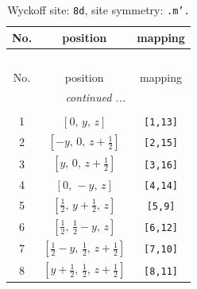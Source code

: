\documentclass[fleqn,8pt]{jsarticle}
\begin{document}
\begin{longtable}{ccc}
\caption{Wyckoff site: {\tt 8d}, site symmetry: {\tt .m'.}}
 \\
 \hline \hline
No. & position & mapping \\ \hline \endfirsthead

\multicolumn{2}{l}{\tablename\ \thetable{}} \\
 \hline \hline
No. & position & mapping \\ \hline \endhead

 \hline \hline
\multicolumn{2}{r}{\footnotesize\it continued ...} \\ \endfoot

 \hline \hline
\multicolumn{2}{r}{} \\ \endlastfoot

1 & $\left[ 0,\, y,\, z \right]$ & {\tt [1,13]} \\ \hline
2 & $\left[ - y,\, 0,\, z + \frac{1}{2} \right]$ & {\tt [2,15]} \\ \hline
3 & $\left[ y,\, 0,\, z + \frac{1}{2} \right]$ & {\tt [3,16]} \\ \hline
4 & $\left[ 0,\, - y,\, z \right]$ & {\tt [4,14]} \\ \hline
5 & $\left[ \frac{1}{2},\, y + \frac{1}{2},\, z \right]$ & {\tt [5,9]} \\ \hline
6 & $\left[ \frac{1}{2},\, \frac{1}{2} - y,\, z \right]$ & {\tt [6,12]} \\ \hline
7 & $\left[ \frac{1}{2} - y,\, \frac{1}{2},\, z + \frac{1}{2} \right]$ & {\tt [7,10]} \\ \hline
8 & $\left[ y + \frac{1}{2},\, \frac{1}{2},\, z + \frac{1}{2} \right]$ & {\tt [8,11]} \\
\end{longtable}
\renewcommand{\arraystretch}{1.2}
\end{document}
